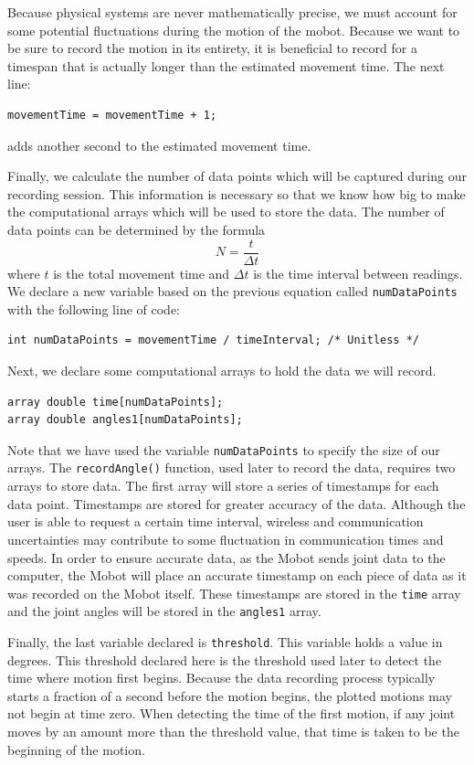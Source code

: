 \documentclass{article}
\begin{document}
Because physical systems are never mathematically precise, we must account for some
potential fluctuations during the motion of the mobot. Because we want to be sure 
to record the motion in its entirety, it is beneficial to record for a timespan that
is actually longer than the estimated movement time. The next line:
\begin{verbatim}
movementTime = movementTime + 1; 
\end{verbatim}
adds another second to the estimated movement time.

Finally, we calculate the number of data points which will be captured during our 
recording session. This information is necessary so that we know how big to make
the computational arrays which will be used to store the data. The number
of data points can be determined by the formula
\begin{equation*}
N = \frac{t}{\Delta t}
\end{equation*}
where $t$ is the total movement time and $\Delta t$ is the time interval between
readings. We declare a new variable based on the previous equation called \texttt{numDataPoints} with 
the following line of code:
\begin{verbatim}
int numDataPoints = movementTime / timeInterval; /* Unitless */
\end{verbatim}

Next, we declare some computational arrays to hold the data we will record.
\begin{verbatim}
array double time[numDataPoints];
array double angles1[numDataPoints];
\end{verbatim}
Note that we have used the variable \texttt{numDataPoints} to specify the size
of our arrays. The \texttt{recordAngle()} function, used later to record the data,
requires two arrays to store data. The first array will store a series of timestamps
for each data point. Timestamps are stored for greater accuracy of the data. Although
the user is able to request a certain time interval, wireless and communication 
uncertainties may contribute to some fluctuation in communication times and speeds. 
In order to ensure accurate data, as the Mobot sends joint data to the computer, 
the Mobot will place an accurate timestamp on each piece of data as it was recorded
on the Mobot itself. These timestamps are stored in the \texttt{time} array and
the joint angles will be stored in the \texttt{angles1} array.

Finally, the last variable declared is \texttt{threshold}. This variable 
holds a value in degrees. This threshold declared here is the threshold used
later to detect the time where motion first begins. Because the data recording 
process typically starts a fraction of a second before the motion begins, the
plotted motions may not begin at time zero. When detecting the time of the
first motion, if any joint moves by an amount more than the threshold value, 
that time is taken to be the beginning of the motion.
\end{document}
